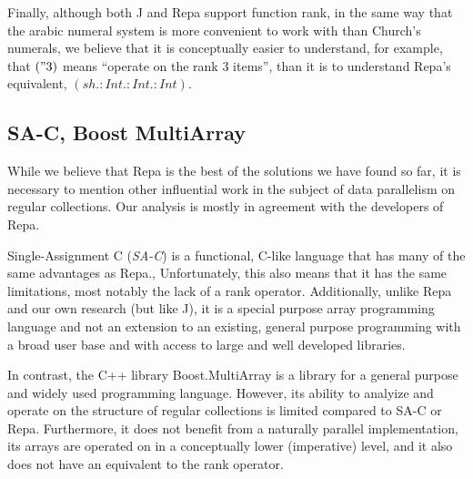 Finally, although both J and Repa support function rank, 
in the same way that the arabic numeral system is more convenient to work with than Church's numerals, 
we believe that it is conceptually easier to understand, for example, that $(" 3)$ means ``operate on the rank 3 items'', than it is to understand Repa's equivalent, $(sh.:Int.:Int.:Int)$.

\subsection{SA-C, Boost MultiArray}
While we believe that Repa is the best of the solutions we have found so far, 
it is necessary to mention other influential work in the subject of data parallelism on regular collections.
Our analysis is mostly in agreement with the developers of Repa.\cite{dph}

Single-Assignment C (\textit{SA-C}) is a functional, C-like language 
that has many of the same advantages as Repa.\cite{dph}, \cite{sac}
Unfortunately, this also means that it has the same limitations, most notably the lack of a rank operator.
Additionally, unlike Repa and our own research (but like J), 
it is a special purpose array programming language and 
not an extension to an existing, general purpose programming with a broad user base and 
with access to large and well developed libraries.

In contrast, the C++ library Boost.MultiArray is a library for a general purpose and widely used programming language. \cite{boost}
However, its ability to analyize and operate on the structure of regular collections is limited compared to SA-C or Repa.
Furthermore, it does not benefit from a naturally parallel implementation, 
its arrays are operated on in a conceptually lower (imperative) level, 
and it also does not have an equivalent to the rank operator. 
